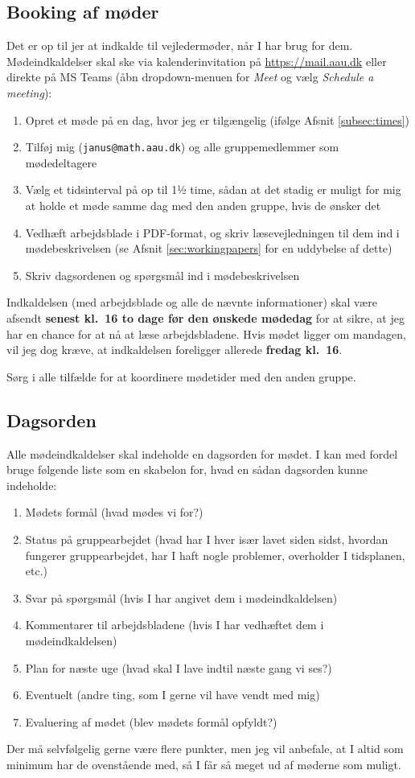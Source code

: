 \subsection{Booking af møder}
\label{subsec:booking}
Det er op til jer at indkalde til vejledermøder, når I har brug for dem.
Mødeindkaldelser skal ske via kalenderinvitation på \url{https://mail.aau.dk} eller direkte på MS Teams (åbn dropdown-menuen for \emph{Meet} og vælg \emph{Schedule a meeting}):
\begin{enumerate}[itemsep=0pt]
\item Opret et møde på en dag, hvor jeg er tilgængelig (ifølge Afsnit \ref{subsec:times})
\item Tilføj mig (\texttt{janus@math.aau.dk}) og alle gruppemedlemmer som mødedeltagere
\item Vælg et tidsinterval på op til 1½ time, sådan at det stadig er muligt for mig at holde et møde samme dag med den anden gruppe, hvis de ønsker det
\item Vedhæft arbejdsblade i PDF-format, og skriv læsevejledningen til dem ind i mødebeskrivelsen (se Afsnit \ref{sec:workingpapers} for en uddybelse af dette)
\item Skriv dagsordenen og spørgsmål ind i mødebeskrivelsen
\end{enumerate}
Indkaldelsen (med arbejdsblade og alle de nævnte informationer) skal være afsendt \textbf{senest kl.\ 16 to dage før den ønskede mødedag} for at sikre, at jeg har en chance for at nå at læse arbejdsbladene.
Hvis mødet ligger om mandagen, vil jeg dog kræve, at indkaldelsen foreligger allerede \textbf{fredag kl.\ 16}.

Sørg i alle tilfælde for at koordinere mødetider med den anden gruppe.

\subsection{Dagsorden}
\label{subsec:agenda}
Alle mødeindkaldelser skal indeholde en dagsorden for mødet.
I kan med fordel bruge følgende liste som en skabelon for, hvad en sådan dagsorden kunne indeholde:
\begin{enumerate}[itemsep=0pt]
\item Mødets formål (hvad mødes vi for?)
\item Status på gruppearbejdet (hvad har I hver især lavet siden sidst, hvordan fungerer gruppearbejdet, har I haft nogle problemer, overholder I tidsplanen, etc.)
\item Svar på spørgsmål (hvis I har angivet dem i mødeindkaldelsen)
\item Kommentarer til arbejdsbladene (hvis I har vedhæftet dem i mødeindkaldelsen)
\item Plan for næste uge (hvad skal I lave indtil næste gang vi ses?)
\item Eventuelt (andre ting, som I gerne vil have vendt med mig)
\item Evaluering af mødet (blev mødets formål opfyldt?)
\end{enumerate}
Der må selvfølgelig gerne være flere punkter, men jeg vil anbefale, at I altid som minimum har de ovenstående med, så I får så meget ud af møderne som muligt.

